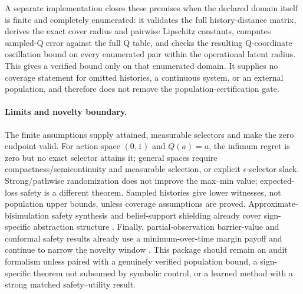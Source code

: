 A separate implementation closes these premises when the declared domain itself is finite and
completely enumerated: it validates the full history-distance matrix, derives the exact cover
radius and pairwise Lipschitz constants, computes sampled-Q error against the full Q table, and
checks the resulting Q-coordinate oscillation bound on every enumerated pair within the operational
latent radius.  This gives a verified bound only on that enumerated domain.  It supplies no coverage
statement for omitted histories, a continuous system, or an external population, and therefore
does not remove the population-certification gate.

\paragraph{Limits and novelty boundary.}
The finite assumptions supply attained, measurable selectors and make the zero endpoint valid.
For action space $(0,1)$ and $Q(a)=a$, the infimum regret is zero but no exact selector attains it;
general spaces require compactness/semicontinuity and measurable selection, or explicit
$\epsilon$-selector slack.  Strong/pathwise randomization does not improve the max--min value;
expected-loss safety is a different theorem.  Sampled histories give lower witnesses, not
population upper bounds, unless coverage assumptions are proved.  Approximate-bisimulation safety
synthesis and belief-support shielding already cover sign-specific abstraction structure
\citep{girard2012safety,sheng2024safe}.  Finally, partial-observation
barrier-value and conformal safety results already use a minimum-over-time margin payoff and
continue to narrow the novelty window \citep{jahanshahi2026cbvf}.  This package should remain an
audit formalism unless paired with a genuinely verified population bound, a sign-specific theorem
not subsumed by symbolic control, or a learned method with a strong matched safety--utility result.
